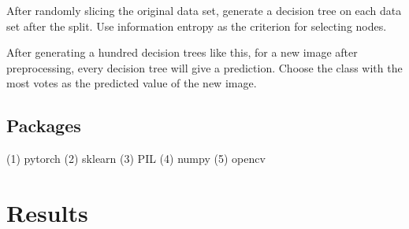 \documentclass{article}
\begin{document}
  After randomly slicing the original data set, generate a decision tree on each data set after the split. Use information entropy as the criterion for selecting nodes.

  After generating a hundred decision trees like this, for a new image after preprocessing, every decision tree will give a prediction. Choose the class with the most votes as the predicted value of the new image.

  \subsection{Packages}
    (1) pytorch
    (2) sklearn
    (3) PIL
    (4) numpy
    (5) opencv

\section{Results}
\end{document}

